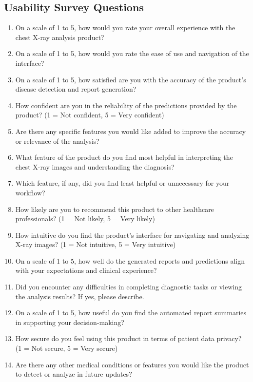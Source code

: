 \documentclass[12pt, titlepage]{article}
\begin{document}
\begin{enumerate}
\begin{enumerate}
\begin{enumerate}
\begin{enumerate}
\subsection{Usability Survey Questions}

\begin{enumerate}
  \item On a scale of 1 to 5, how would you rate your overall experience with the chest X-ray analysis product?
  \item On a scale of 1 to 5, how would you rate the ease of use and navigation of the interface?
  \item On a scale of 1 to 5, how satisfied are you with the accuracy of the product's disease detection and report generation?
  \item How confident are you in the reliability of the predictions provided by the product? (1 = Not confident, 5 = Very confident)
  \item Are there any specific features you would like added to improve the accuracy or relevance of the analysis?
  \item What feature of the product do you find most helpful in interpreting the chest X-ray images and understanding the diagnosis?
  \item Which feature, if any, did you find least helpful or unnecessary for your workflow?
  \item How likely are you to recommend this product to other healthcare professionals? (1 = Not likely, 5 = Very likely)
  \item How intuitive do you find the product’s interface for navigating and analyzing X-ray images? (1 = Not intuitive, 5 = Very intuitive)
  \item On a scale of 1 to 5, how well do the generated reports and predictions align with your expectations and clinical experience?
  \item Did you encounter any difficulties in completing diagnostic tasks or viewing the analysis results? If yes, please describe.
  \item On a scale of 1 to 5, how useful do you find the automated report summaries in supporting your decision-making?
  \item How secure do you feel using this product in terms of patient data privacy? (1 = Not secure, 5 = Very secure)
  \item Are there any other medical conditions or features you would like the product to detect or analyze in future updates?
\end{enumerate}





\end{enumerate}
\end{enumerate}
\end{enumerate}
\end{enumerate}
\end{document}
